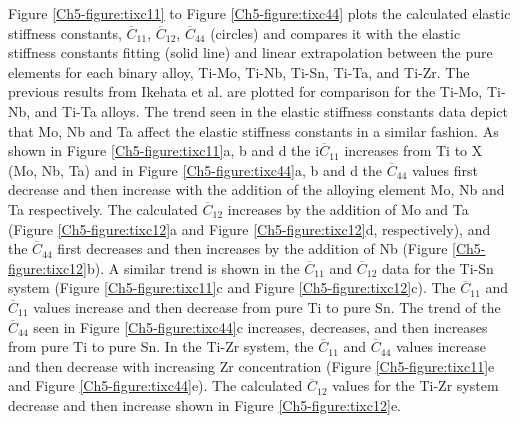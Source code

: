 Figure \ref{Ch5-figure:tixc11} to Figure \ref{Ch5-figure:tixc44} plots the calculated elastic stiffness constants, $\overline{C}_{11}$, $\overline{C}_{12}$, $\overline{C}_{44}$ (circles) and compares it with the elastic stiffness constants fitting (solid line) and linear extrapolation between the pure elements for each binary alloy, Ti-Mo, Ti-Nb, Ti-Sn, Ti-Ta, and Ti-Zr. The previous results from Ikehata et al. \cite{Ikehata2004} are plotted for comparison for the Ti-Mo, Ti-Nb, and Ti-Ta alloys. The trend seen in the elastic stiffness constants data depict that Mo, Nb and Ta affect the elastic stiffness constants in a similar fashion. As shown in Figure \ref{Ch5-figure:tixc11}a, b and d the  i$\overline{C}_{11}$ increases from Ti to X (Mo, Nb, Ta) and in Figure \ref{Ch5-figure:tixc44}a, b and d the  $\overline{C}_{44}$ values first decrease and then increase with the addition of the alloying element Mo, Nb and Ta respectively. The calculated $\overline{C}_{12}$ increases by the addition of Mo and Ta (Figure \ref{Ch5-figure:tixc12}a and Figure \ref{Ch5-figure:tixc12}d, respectively), and the $\overline{C}_{44}$  first decreases and then increases by the addition of Nb (Figure \ref{Ch5-figure:tixc12}b). A similar trend is shown in the $\overline{C}_{11}$ and $\overline{C}_{12}$ data for the Ti-Sn system (Figure \ref{Ch5-figure:tixc11}c and Figure \ref{Ch5-figure:tixc12}c). The $\overline{C}_{11}$ and $\overline{C}_{11}$ values increase and then decrease from pure Ti to pure Sn. The trend of the  $\overline{C}_{44}$ seen in Figure \ref{Ch5-figure:tixc44}c increases, decreases, and then increases from pure Ti to pure Sn. In the Ti-Zr system, the $\overline{C}_{11}$ and $\overline{C}_{44}$ values increase and then decrease with increasing Zr concentration (Figure \ref{Ch5-figure:tixc11}e and Figure \ref{Ch5-figure:tixc44}e). The calculated $\overline{C}_{12}$ values for the Ti-Zr system decrease and then increase shown in Figure \ref{Ch5-figure:tixc12}e.

